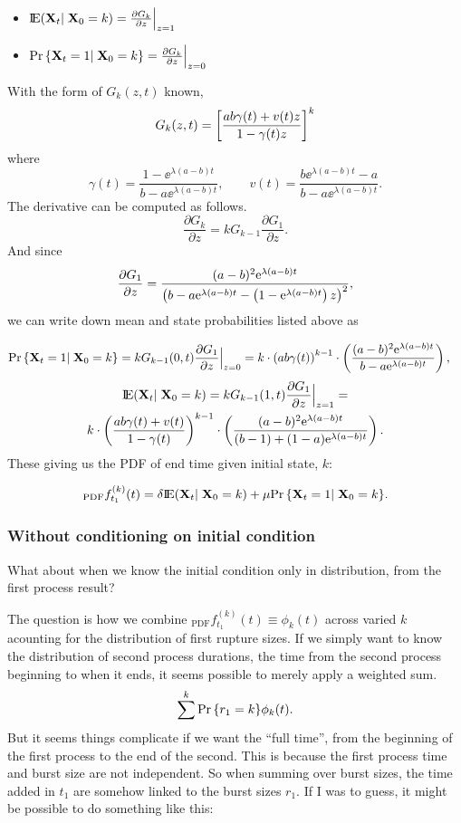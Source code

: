 \begin{itemize}
\item ${\rm I}\!{\rm E}({{\bf X}_t}|\;{\bf X}_0 = k) = \frac{\partial G_k}{\partial z}\Big\rvert_{z=1}$
\item $  {\text{Pr}\left\{{{\bf X}_t} = 1 | \; {\bf X}_0 = k\right\}} = \frac{\partial G_k}{\partial z}\Big\rvert_{z=0}$ 
\end{itemize}
With the form of $G_k(z,t)$ known, 
$$G_k(z,t) = \left[\frac{ab\gamma(t) + v(t)z}{1- \gamma(t)z}\right]^k$$
where
$$\gamma(t) = \frac{1 - \ee^{\lambda(a-b)t}}{b - a\ee^{\lambda(a-b)t}}, \quad\quad v(t) = \frac{b\ee^{\lambda(a-b)t} -a}{b - a\ee^{\lambda(a-b)t}}.$$
The derivative can be computed as follows.
$$ \frac{\partial G_k}{\partial z} = kG_{k-1}  \frac{\partial G_1}{\partial z}.$$
And since 
$$ \frac{\partial G_1}{\partial z} = \frac{(a-b)^2 {{\rm e}^{\lambda(a-b)t}}}{\left( b-a{{\rm e}^{\lambda(a-b)t}}- \left(1 - {{\rm e}^{\lambda(a-b)t}} \right) z\right)^2},$$
we can write down mean and state probabilities listed above as 

\begin{align*}
{\text{Pr}\left\{{{\bf X}_t}= 1 | \; {\bf X}_0 = k\right\}}  &=  kG_{k-1}(0, t)  \frac{\partial G_1}{\partial z}\Big\rvert_{z=0} =  k\cdot    \left( ab\gamma(t)\right)^{k-1} \cdot \left(\frac{(a-b)^2 {{\rm e}^{\lambda(a-b)t}}}{b - a {{\rm e}^{\lambda(a-b)t}}}\right),
\end{align*} 
\begin{multline*}
{\rm I}\!{\rm E}({{\bf X}_t}|\;{\bf X}_0 = k) = kG_{k-1}(1, t)  \frac{\partial G_1}{\partial z}\Big\rvert_{z=1}  = \\k\cdot \left(\frac{ab\gamma(t) + v(t)}{1 - \gamma(t)} \right)^{k-1} \cdot \left(\frac{(a-b)^2{{\rm e}^{\lambda(a-b)t}}}{(b-1)+(1-a){{\rm e}^{\lambda(a-b)t}}}\right).
\end{multline*} 
These giving us the PDF of end time given initial state, $k$:

$$_{\text{PDF}}f^{(k)}_{t_1} (t) =  \delta {\rm I}\!{\rm E}({{\bf X}_t}|\;{\bf X}_0 = k) + \mu{\text{Pr}\left\{{{\bf X}_t}= 1 | \; {\bf X}_0 = k\right\}}. $$

\subsubsection*{Without conditioning on initial condition}
What about when we know the initial condition only in distribution, from the first process result?\par
The question is how we combine $_{\text{PDF}}f^{(k)}_{t_1}(t)  \equiv \phi_k(t)$ across varied $k$ acounting for the distribution of first rupture sizes. If we simply want to know the distribution of second process durations, the time from the second process beginning to when it ends, it seems possible to merely apply a weighted sum. 
$$\sum^{k} {\text{Pr}\left\{r_1 = k\right\}}\phi_k(t).$$
But it seems things complicate if we want the ``full time'', from the beginning of the first process to the end of the second. This is because the first process time and burst size are not independent. So when summing over burst sizes, the time added in $t_1$ are somehow linked to the burst sizes $r_1$. If I was to guess, it might be possible to do something like this:

